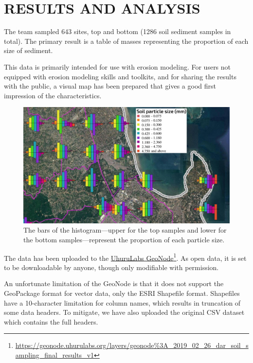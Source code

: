 \documentclass[a4paper,12pt,twoside]{article}
\begin{document}
\newpage 
\color{RHblue}
\section{RESULTS AND ANALYSIS}
\label{resultsandanalysis}
\color{RHgrey}
The team sampled 643 sites, top and bottom (1286 soil sediment samples in total). The primary result is a table of masses representing the proportion of each size of sediment.

This data is primarily intended for use with erosion modeling. For users not equipped with erosion modeling skills and toolkits, and for sharing the results with the public, a visual map has been prepared that gives a good first impression of the characteristics.

\begin{figure}[h]
  \scriptsize\color{RHgreen}\caption{The bars of the histogram---upper for the top samples and lower for the bottom samples---represent the proportion of each particle size.}
  \centering
  \includegraphics[width=1\textwidth]{soil_map_detail_peninsula_with_legend}
\end{figure}

\color{RHgrey}
The data has been uploaded to the \href{https://geonode.uhurulabs.org/layers/geonode\%3A_2019_02_26_dar_soil_sampling_final_results_v1}{UhuruLabs GeoNode}\footnote{\url {https://geonode.uhurulabs.org/layers/geonode\%3A_2019_02_26_dar_soil_sampling_final_results_v1}}. As open data, it is set to be downloadable by anyone, though only modifiable with permission.

An unfortunate limitation of the GeoNode is that it does not support the GeoPackage format for vector data, only the ESRI Shapefile format. Shapefiles have a 10-character limitation for column names, which results in truncation of some data headers. To mitigate, we have also uploaded the original CSV dataset which contains the full headers. 
\end{document}
